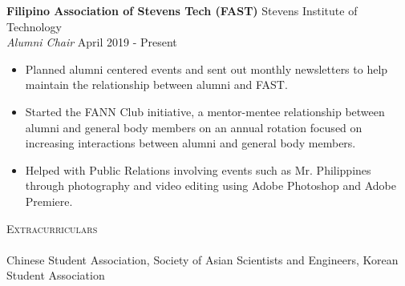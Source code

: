\documentclass[10pt]{article}
\newcommand{\lineunder} {
    \vspace*{-8pt} \\
    \hspace*{-18pt} \hrulefill \\
}
\newcommand{\header} [1] {
    {\hspace*{-18pt}\vspace*{6pt} \textsc{#1}}
    \vspace*{-6pt} \lineunder
}
\begin{document}
\textbf{Filipino Association of Stevens Tech (FAST)} \hfill Stevens Institute of Technology\\
\textit{Alumni Chair} \hfill April 2019 - Present\\
\vspace{-1mm}
\begin{itemize} \itemsep 1pt
	\item Planned alumni centered events and sent out monthly newsletters to help maintain the relationship between alumni and FAST.
	\item Started the FANN Club initiative, a mentor-mentee relationship between alumni and general body members on an annual rotation focused on increasing interactions between alumni and general body members.
	\item Helped with Public Relations involving events such as Mr. Philippines through photography and video editing using Adobe Photoshop and Adobe Premiere.
\end{itemize}
\header{Extracurriculars}
Chinese Student Association, Society of Asian Scientists and Engineers, Korean Student Association
\end{document}
